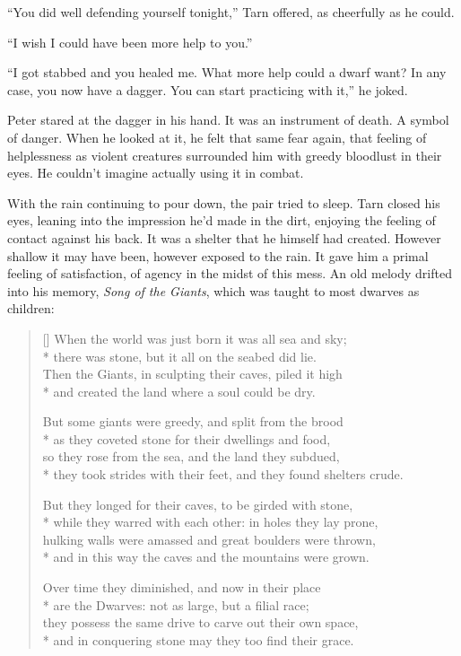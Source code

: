 ``You did well defending yourself tonight,'' Tarn offered, as cheerfully as he could.

``I wish I could have been more help to you.''

``I got stabbed and you healed me.  What more help could a dwarf want?  In any case, you now have a dagger.  You can start practicing with it,'' he joked.

Peter stared at the dagger in his hand.  It was an instrument of death.  A symbol of danger.  When he looked at it, he felt that same fear again, that feeling of helplessness as violent creatures surrounded him with greedy bloodlust in their eyes.  He couldn't imagine actually using it in combat.

With the rain continuing to pour down, the pair tried to sleep.  Tarn closed his eyes, leaning into the impression he'd made in the dirt, enjoying the feeling of contact against his back.  It was a shelter that he himself had created.  However shallow it may have been, however exposed to the rain.  It gave him a primal feeling of satisfaction, of agency in the midst of this mess.  An old melody drifted into his memory, \emph{Song of the Giants}, which was taught to most dwarves as children:

\settowidth{\versewidth}{hulking walls were amassed and great boulders were thrown,}
\begin{verse}[\versewidth]
When the world was just born it was all sea and sky;\\*
there was stone, but it all on the seabed did lie.\\
Then the Giants, in sculpting their caves, piled it high\\*
and created the land where a soul could be dry.

But some giants were greedy, and split from the brood\\*
as they coveted stone for their dwellings and food,\\
so they rose from the sea, and the land they subdued,\\*
they took strides with their feet, and they found shelters crude.

But they longed for their caves, to be girded with stone,\\*
while they warred with each other: in holes they lay prone,\\
hulking walls were amassed and great boulders were thrown,\\*
and in this way the caves and the mountains were grown.

Over time they diminished, and now in their place\\*
are the Dwarves: not as large, but a filial race;\\
they possess the same drive to carve out their own space,\\*
and in conquering stone may they too find their grace.
\end{verse}

